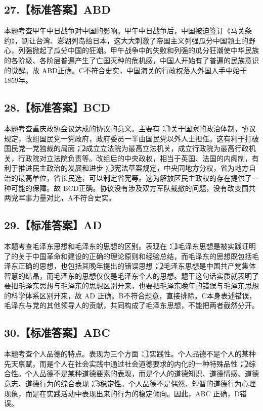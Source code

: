 \documentclass[UTF8,11pt]{ctexart}
\begin{document}
\subsection*{27.【标准答案】ABD}

本题考查甲午中日战争对中国的影响。甲午中日战争后，中国被迫签订《马关条约》，割让台湾、澎湖列岛给日本，这大大刺激了帝国主义列强瓜分中国领土的野心，列强掀起了瓜分中国的狂潮。甲午战争中的失败和列强的瓜分狂潮使中华民族的各阶级、各阶层普遍产生了亡国灭种的危机感，中国人开始有了普遍的民族意识的觉醒。故 ABD正确。C不符合史实，中国海关的行政权落人外国人手中始于1859年。


\subsection*{28.【标准答案】BCD}

本题考查重庆政协会议达成的协议的意义。主要有：\textcircled{1}关于国家的政治体制，协议规定，改组国民党一党政府，政府委员一半由国民党以外人士担任。这有利于打破国民党一党独裁的局面；\textcircled{2}成立立法院为最高立法机关，成立行政院为最高行政机关，行政院对立法院负责等。改组后的中央政权，相当于英国、法国的内阁制，有利于推进民主政治的发展和进步；\textcircled{3}宪法草案规定，中央同地方分权，省为地方自治的最高单位，省长民选，可以制定省宪等。这为解放区民主政权的存在提供了一种可能的保障。故 BCD正确。协议没有涉及双方军队裁撤的问题，没有改变国共两党军事力量对比，A不符合史实。


\subsection*{29.【标准答案】AD}

本题考查毛泽东思想和毛泽东的思想的区别。表现在：\textcircled{1}毛泽东思想是被实践证明了的关于中国革命和建设的正确的理论原则和经验总结，而毛泽东的思想既包括毛泽东正确的思想，也包括其晚年提出的错误思想；\textcircled{2}毛泽东思想是中国共产党集体智慧的结晶，而毛泽东的思想仅仅是毛泽东个人的思想。题干这句话实质就表明了要把毛泽东思想与毛泽东的思想区别开来，也要把毛泽东晚年的错误与毛泽东思想的科学体系区别开来，故 AD 正确。B不符合题意，直接排除。C本身表述错误，毛泽东与党的其他领导人的贡献，共同构成了毛泽东思想，不能把两者截然分开。


\subsection*{30.【标准答案】ABC}

本题考查个人品德的特点。表现为三个方面：\textcircled{1}实践性。个人品德不是个人的某种先天禀赋，而是个人在社会实践中通过社会道德要求的内化的一种特殊品性；\textcircled{2}综合性。个人品德不是某种道德要素的表现，而是个人的道德知识、道德情感、道德意志、道德行为的综合表现；\textcircled{3}稳定性。个人品德不是偶然、短暂的道德行为心理现象，而是在实践活动中表现出来的行为的稳定倾向。因此，ABC 正确，D错误。
\end{document}
